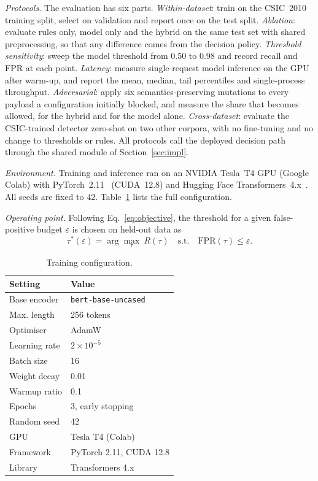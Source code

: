 \documentclass[preprint,11pt]{elsarticle}
\let\footnotesize\normalsize
\begin{document}
\emph{Protocols.} The evaluation has six parts.
\emph{Within-dataset}: train on the CSIC~2010 training split, select on
validation and report once on the test split.
\emph{Ablation}: evaluate rules only, model only and the hybrid on the same
test set with shared preprocessing, so that any difference comes from the
decision policy.
\emph{Threshold sensitivity}: sweep the model threshold from $0.50$ to
$0.98$ and record recall and FPR at each point.
\emph{Latency}: measure single-request model inference on the GPU after
warm-up, and report the mean, median, tail percentiles and single-process
throughput.
\emph{Adversarial}: apply six semantics-preserving mutations to every
payload a configuration initially blocked, and measure the share that
becomes allowed, for the hybrid and for the model alone.
\emph{Cross-dataset}: evaluate the CSIC-trained detector zero-shot on two
other corpora, with no fine-tuning and no change to thresholds or rules.
All protocols call the deployed decision path through the shared module of
Section~\ref{sec:impl}.

\emph{Environment.} Training and inference ran on an NVIDIA Tesla~T4 GPU
(Google Colab) with PyTorch~2.11~\cite{paszke2019pytorch} (CUDA~12.8) and
Hugging Face Transformers~4.x~\cite{wolf2020transformers}. All seeds are fixed to $42$.
Table~\ref{tab:hyperparams} lists the full configuration.

\emph{Operating point.} Following Eq.~\eqref{eq:objective}, the threshold
for a given false-positive budget $\varepsilon$ is chosen on held-out data as
\begin{equation}
\tau^\ast(\varepsilon)=\arg\max_{\tau}\ R(\tau)\quad\text{s.t.}\quad
\mathrm{FPR}(\tau)\le\varepsilon .
\label{eq:taustar}
\end{equation}

\begin{table}[t]
\centering
\footnotesize
\caption{Training configuration.}
\label{tab:hyperparams}
\begin{tabular}{@{}ll@{}}
\toprule
Setting & Value \\
\midrule
Base encoder & \texttt{bert-base-uncased} \\
Max. length & 256 tokens \\
Optimiser & AdamW \\
Learning rate & $2\times10^{-5}$ \\
Batch size & 16 \\
Weight decay & 0.01 \\
Warmup ratio & 0.1 \\
Epochs & 3, early stopping \\
Random seed & 42 \\
GPU & Tesla T4 (Colab) \\
Framework & PyTorch 2.11, CUDA 12.8 \\
Library & Transformers 4.x \\
\bottomrule
\end{tabular}
\end{table}
\end{document}
